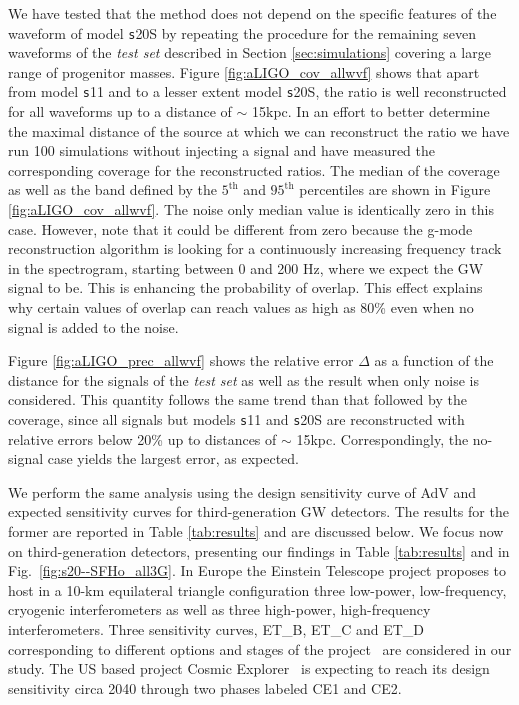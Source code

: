 We have tested that the method does not depend on the specific features of the waveform of model {\texttt s20S} by repeating the procedure for the remaining seven waveforms of the {\it test set} described in Section \ref{sec:simulations} covering
a large range of progenitor masses. Figure \ref{fig:aLIGO_cov_allwvf} shows that apart from model {\texttt s11} and to a lesser extent model {\texttt s20S}, the ratio is well reconstructed for all waveforms up to a distance of $\sim$ 15kpc. In an
effort to better determine the maximal distance of the source at which we can reconstruct the ratio we have run 100 simulations without injecting a signal and have measured the corresponding coverage for the reconstructed ratios.
The median of the coverage as well as the band defined by the $\mathrm{5^{th}}$ and $\mathrm{95^{th}}$ percentiles are shown in Figure \ref{fig:aLIGO_cov_allwvf}.
The noise only median value is identically zero in this case. However, note that it could be different
from zero because
the g-mode reconstruction algorithm is looking for a continuously  increasing frequency track
in the spectrogram, starting between 0 and 200 Hz, where we expect the GW signal to be.
This is enhancing the probability of overlap. This effect explains why certain values of overlap can reach
values as high as 80\% even when no signal is added to the noise.

Figure \ref{fig:aLIGO_prec_allwvf} shows the relative error $\Delta$ as a function of the distance for the signals of the {\it test set}
as well as the result when only noise is considered. This quantity follows the same trend than that followed by the coverage, since all signals but models {\texttt s11} and {\texttt s20S} are reconstructed with relative errors below 20\% up to distances of $\sim$ 15kpc. Correspondingly, the no-signal case yields the largest error, as expected.

We perform the same analysis using the design sensitivity curve of AdV and expected sensitivity curves for third-generation 
GW detectors. The results for the former are reported in Table \ref{tab:results} and are discussed below. We focus now on third-generation detectors, presenting our findings in Table \ref{tab:results} and in Fig.~\ref{fig:s20--SFHo_all3G}. In Europe the Einstein Telescope project proposes to host in a 10-km equilateral triangle configuration three low-power, low-frequency, cryogenic interferometers as well as three high-power, high-frequency interferometers. Three sensitivity curves, ET\_B, ET\_C and ET\_D corresponding to different options and stages of the project~\cite{Hild_2011} are considered in our study. %
The US based project Cosmic Explorer~\cite{reitze2019cosmic} is expecting to reach its design
sensitivity circa 2040 through two phases labeled CE1 and CE2. %


